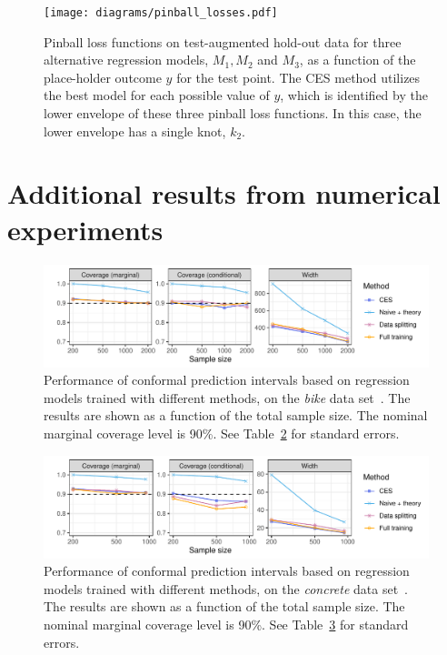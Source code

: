 \begin{figure}[!htb]
    \centering
    \texttt{[image: diagrams/pinball\_losses.pdf]}
    \caption{\color{blue} Pinball loss functions on test-augmented hold-out data for three alternative regression models, $M_1, M_2$ and $M_3$, as a function of the place-holder outcome $y$ for the test point. The CES method utilizes the best model for each possible value of $y$, which is identified by the lower envelope of these three pinball loss functions. In this case, the lower envelope has a single knot, $k_{2}$.}
    \label{fig:pinball_losses}%
\end{figure}

\clearpage
\section{Additional results from numerical experiments} \label{app:numerical-results}


\begin{figure}[!htb]
    \centering
    \includegraphics[width=0.8\linewidth]{figures/exp_regression_bike.pdf}
    \caption{Performance of conformal prediction intervals based on regression models trained with different methods, on the {\em bike} data set~\cite{data-bike}. The results are shown as a function of the total sample size. The nominal marginal coverage level is 90\%. See Table~\ref{fig:exp_regression_bike} for standard errors.}
    \label{fig:exp_regression_bike}
\end{figure}

\begin{figure}[!htb]
    \centering
    \includegraphics[width=0.8\linewidth]{figures/exp_regression_concrete.pdf}
    \caption{Performance of conformal prediction intervals based on regression models trained with different methods, on the {\em concrete} data set~\cite{data-concrete}. The results are shown as a function of the total sample size. The nominal marginal coverage level is 90\%. See Table~\ref{fig:exp_regression_concrete} for standard errors.}
    \label{fig:exp_regression_concrete}
\end{figure}


